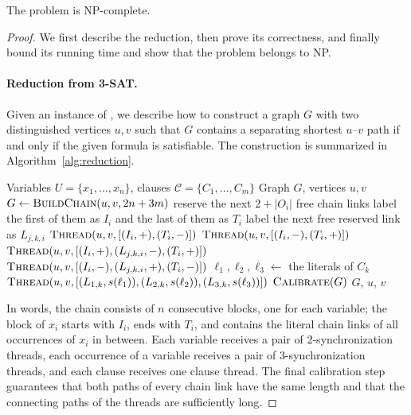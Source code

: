 \begin{theorem}
\label{thm:ssp-np-complete}
The \SSP{} problem is NP-complete.
\end{theorem}

\begin{proof}
We first describe the reduction, then prove its correctness, and finally bound its running time and show that the problem belongs to NP.

\paragraph{Reduction from 3-SAT.}
Given an instance of \ThreeSAT, we describe how to construct a graph $G$ with two distinguished vertices $u,v$ such that $G$ contains a separating shortest $u$--$v$ path if and only if the given formula is satisfiable.
The construction is summarized in Algorithm~\ref{alg:reduction}.


\begin{algorithm}[H]
\caption{Reduction from \ThreeSAT{} to \SSP}
\label{alg:reduction}
\begin{algorithmic}[1]
\Require Variables $U=\{x_1,\dots,x_n\}$, clauses $\mathcal{C}=\{C_1,\dots,C_m\}$
\Ensure Graph $G$, vertices $u,v$
\State $G \gets \textsc{BuildChain}(u,v,2n+3m)$
    \State reserve the next $2+|O_i|$ free chain links
    \State label the first of them as $I_i$ and the last of them as $T_i$
        \State label the next free reserved link as $L_{j,k,i}$
    \EndFor
\EndFor
{}
    \State $\textsc{Thread}(u,v,[(I_i,+),(T_i,-)])$
    \State $\textsc{Thread}(u,v,[(I_i,-),(T_i,+)])$
        \State $\textsc{Thread}(u,v,[(I_i,+),(L_{j,k,i},-),(T_i,+)])$
        \State $\textsc{Thread}(u,v,[(I_i,-),(L_{j,k,i},+),(T_i,-)])$
    \EndFor
\EndFor
{}
    \State $\ell_1,\ell_2,\ell_3 \gets$ the literals of $C_k$
    \State $\textsc{Thread}(u,v,[(L_{1,k},s(\ell_1)),(L_{2,k},s(\ell_2)),(L_{3,k},s(\ell_3))])$
\EndFor
\State $\textsc{Calibrate}(G)$
\State \Return $G$, $u$, $v$
\end{algorithmic}
\end{algorithm}

In words, the chain consists of $n$ consecutive blocks, one for each variable; the block of $x_i$ starts with $I_i$, ends with $T_i$, and contains the literal chain links of all occurrences of $x_i$ in between.
Each variable receives a pair of 2-synchronization threads, each occurrence of a variable receives a pair of 3-synchronization threads, and each clause receives one clause thread.
The final calibration step guarantees that both paths of every chain link have the same length and that the connecting paths of the threads are sufficiently long.


\end{proof}
